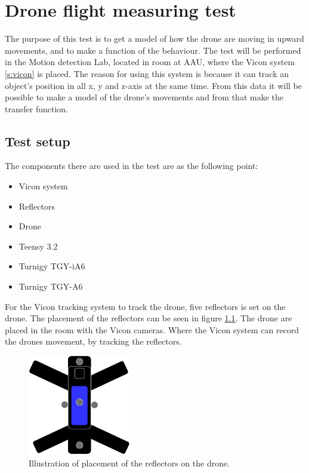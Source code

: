 \chapter{Drone flight measuring test}\label{ap:drone_flight_test}
The purpose of this test is to get a model of how the drone are moving in upward movements, and to make a function of the behaviour. The test will be performed in the Motion detection Lab, located in room  at AAU, where the Vicon system \ref{s:vicon} is placed. The reason for using this system is because it can track an object's position in all x, y and z-axis at the same time. From this data it will be possible to make a model of the drone's movements and from that make the transfer function.

\section*{Test setup}
The components there are used in the test are as the following point:
\begin{itemize}
    \item{Vicon system}
    \item{Reflectors}
    \item{Drone}
    \item{Teensy 3.2} %
    \item{Turnigy TGY-iA6} %
    \item{Turnigy TGY-A6} %
\end{itemize}
For the Vicon tracking system to track the drone, five reflectors is set on the drone. The placement of the reflectors can be seen in figure \ref{fig:reflectors}.
The drone are placed in the room with the Vicon cameras. Where the Vicon system can record the drones movement, by tracking the reflectors. 

\begin{figure}[H]
    \centering
    \includegraphics[width=0.4\textwidth]{figures/Appendix/measuringTest/Reflector1.pdf}
    \caption{Illustration of placement of the reflectors on the drone.}
    \label{fig:reflectors}
\end{figure}


